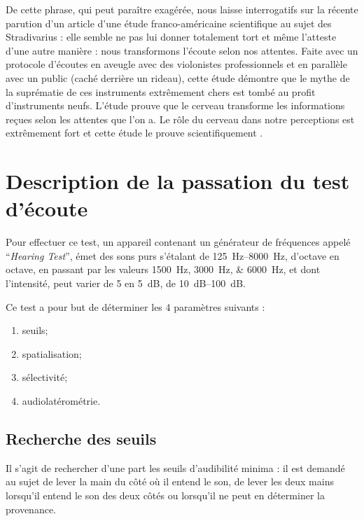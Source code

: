 De cette phrase, qui peut paraître exagérée,
nous laisse interrogatifs sur la récente parution d'un
article d'une étude franco-américaine scientifique
\autocite{fritz_stradivarius} au sujet des Stradivarius : elle semble ne pas lui donner totalement
tort et même l'atteste d'une autre manière : nous transformons l'écoute
selon nos attentes. Faite avec un protocole d'écoutes en aveugle avec
des violonistes professionnels et en parallèle avec un public (caché
derrière un rideau), cette étude démontre que le mythe de la suprématie
de ces instruments extrêmement chers est tombé au profit d'instruments
neufs. L'étude prouve que le cerveau transforme les informations reçues
selon les attentes que l'on a. Le rôle du cerveau dans notre perceptions
est extrêmement fort et cette étude le prouve scientifiquement
\autocite{lemonde.fr:stradivarius}.

\autocite[p. 43]{roque:lecoute}

\section{Description de la passation du test d'écoute}
\label{passation}

Pour effectuer ce test, un appareil contenant un générateur de fréquences appelé ``\emph{Hearing Test}'', émet des sons purs s'étalant de \SIrange{125}{8000}{\Hz}, d'octave en octave, en passant par les valeurs
\SIlist{1500;3000;6000}{\Hz}, et dont l'intensité, peut varier de 5 en \SI{5}{\dB}, de \SIrange{10}{100}{\dB}. 

Ce test a pour but de déterminer les 4 paramètres suivants : 
\begin{enumerate}
\item seuils;
\item spatialisation;
\item sélectivité;
\item audiolatérométrie.
\end{enumerate}

\subsection{Recherche des seuils}

Il s'agit de rechercher d'une part les seuils d'audibilité
minima : il est demandé au sujet de lever la main du côté
où il entend le son, de lever les deux mains lorsqu'il entend le son
des deux côtés ou lorsqu'il ne peut en déterminer la provenance.

